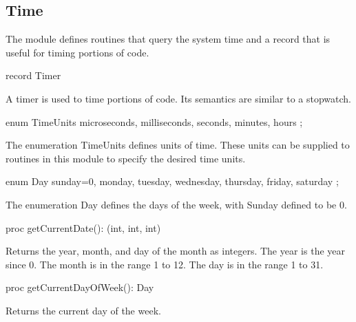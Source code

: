 \subsection{Time}
\label{Time}

The module  defines routines that query the system time and
a record  that is useful for timing portions of code.

\vspace{1pc}

\begin{protohead}
record Timer
\end{protohead}
\begin{protobody}
A timer is used to time portions of code.  Its semantics are similar
to a stopwatch.
\end{protobody}

\begin{protohead}
enum TimeUnits { microseconds, milliseconds, seconds, minutes, hours };
\end{protohead}
\begin{protobody}
The enumeration TimeUnits defines units of time.  These units can be
supplied to routines in this module to specify the desired time units.
\end{protobody}

\begin{protohead}
enum Day { sunday=0, monday, tuesday, wednesday, thursday, friday, saturday };
\end{protohead}
\begin{protobody}
The enumeration Day defines the days of the week, with Sunday defined to be 0.
\end{protobody}

\begin{protohead}
proc getCurrentDate(): (int, int, int)
\end{protohead}
\begin{protobody}
Returns the year, month, and day of the month as integers.  The year
is the year since 0.  The month is in the range 1 to 12.  The day is
in the range 1 to 31.
\end{protobody}

\begin{protohead}
proc getCurrentDayOfWeek(): Day
\end{protohead}
\begin{protobody}
Returns the current day of the week.
\end{protobody}

